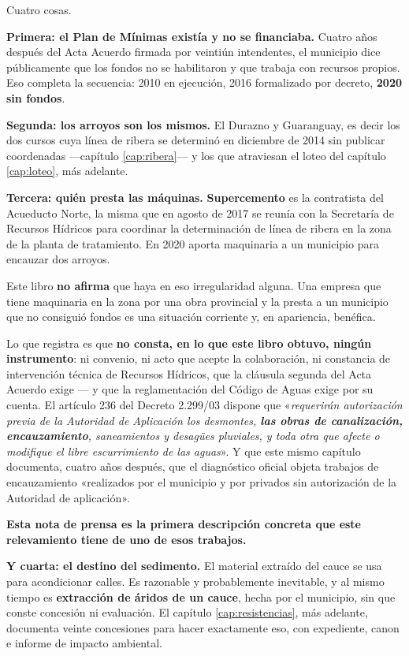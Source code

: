 Cuatro cosas.

\textbf{Primera: el Plan de Mínimas existía y no se financiaba.} Cuatro años después del Acta
Acuerdo firmada por veintiún intendentes, el municipio dice públicamente que los fondos no se
habilitaron y que trabaja con recursos propios. Eso completa la secuencia: 2010 en ejecución,
2016 formalizado por decreto, \textbf{2020 sin fondos}.

\textbf{Segunda: los arroyos son los mismos.} El Durazno y Guaranguay, es decir los dos cursos
cuya línea de ribera se determinó en diciembre de 2014 sin publicar coordenadas ---capítulo
\ref{cap:ribera}--- y los que atraviesan el loteo del capítulo \ref{cap:loteo}, más adelante.

\textbf{Tercera: quién presta las máquinas.} \textbf{Supercemento} es la contratista del
Acueducto Norte, la misma que en agosto de 2017 se reunía con la Secretaría de Recursos
Hídricos para coordinar la determinación de línea de ribera en la zona de la planta de
tratamiento. En 2020 aporta maquinaria a un municipio para encauzar dos arroyos.

\begin{cautela}
Este libro \textbf{no afirma} que haya en eso irregularidad alguna. Una empresa que tiene
maquinaria en la zona por una obra provincial y la presta a un municipio que no consiguió
fondos es una situación corriente y, en apariencia, benéfica.

Lo que registra es que \textbf{no consta, en lo que este libro obtuvo, ningún instrumento}: ni convenio, ni acto que acepte
la colaboración, ni constancia de intervención técnica de Recursos Hídricos, que la cláusula
segunda del Acta Acuerdo exige --- y que la reglamentación del Código de Aguas exige por su
cuenta. El artículo 236 del Decreto 2.299/03 dispone que «\textit{requerirán autorización previa
de la Autoridad de Aplicación los desmontes, \textbf{las obras de canalización, encauzamiento},
saneamientos y desagües pluviales, y toda otra que afecte o modifique el libre escurrimiento de
las aguas}». Y que este mismo capítulo documenta, cuatro años después, que el diagnóstico oficial objeta trabajos de encauzamiento «realizados por el
municipio y por privados sin autorización de la Autoridad de aplicación».

\textbf{Esta nota de prensa es la primera descripción concreta que este relevamiento tiene de uno
de esos trabajos.}
\end{cautela}

\textbf{Y cuarta: el destino del sedimento.} El material extraído del cauce se usa para
acondicionar calles. Es razonable y probablemente inevitable, y al mismo tiempo es
\textbf{extracción de áridos de un cauce}, hecha por el municipio, sin que conste concesión ni
evaluación. El capítulo \ref{cap:resistencias}, más adelante, documenta veinte concesiones para hacer
exactamente eso, con expediente, canon e informe de impacto ambiental.

